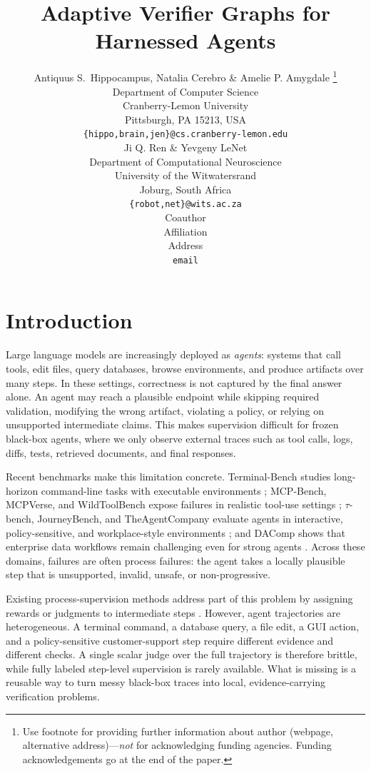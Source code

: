 \documentclass{article} %
\title{Adaptive Verifier Graphs for Harnessed Agents}
\author{Antiquus S.~Hippocampus, Natalia Cerebro \& Amelie P. Amygdale \thanks{ Use footnote for providing further information
about author (webpage, alternative address)---\emph{not} for acknowledging
funding agencies.  Funding acknowledgements go at the end of the paper.} \\
Department of Computer Science\\
Cranberry-Lemon University\\
Pittsburgh, PA 15213, USA \\
\texttt{\{hippo,brain,jen\}@cs.cranberry-lemon.edu} \\
\And
Ji Q. Ren \& Yevgeny LeNet \\
Department of Computational Neuroscience \\
University of the Witwatersrand \\
Joburg, South Africa \\
\texttt{\{robot,net\}@wits.ac.za} \\
\AND
Coauthor \\
Affiliation \\
Address \\
\texttt{email}
}
\begin{document}
\maketitle

\section{Introduction}
\label{sec:introduction}

Large language models are increasingly deployed as \emph{agents}: systems that call tools, edit files, query databases, browse environments, and produce artifacts over many steps. In these settings, correctness is not captured by the final answer alone. An agent may reach a plausible endpoint while skipping required validation, modifying the wrong artifact, violating a policy, or relying on unsupported intermediate claims. This makes supervision difficult for frozen black-box agents, where we only observe external traces such as tool calls, logs, diffs, tests, retrieved documents, and final responses.

Recent benchmarks make this limitation concrete. Terminal-Bench studies long-horizon command-line tasks with executable environments \citep{merrill2026terminalbench}; MCP-Bench, MCPVerse, and WildToolBench expose failures in realistic tool-use settings \citep{wang2025mcpbench,lei2026mcpverse,yu2026wildtoolbench}; $\tau$-bench, JourneyBench, and TheAgentCompany evaluate agents in interactive, policy-sensitive, and workplace-style environments \citep{yao2025taubench,balaji2026journeybench,xu2024theagentcompany}; and DAComp shows that enterprise data workflows remain challenging even for strong agents \citep{lei2026dacomp}. Across these domains, failures are often process failures: the agent takes a locally plausible step that is unsupported, invalid, unsafe, or non-progressive.

Existing process-supervision methods address part of this problem by assigning rewards or judgments to intermediate steps \citep{setlur2025rewardingprogress,fan2026agentprocessbench}. However, agent trajectories are heterogeneous. A terminal command, a database query, a file edit, a GUI action, and a policy-sensitive customer-support step require different evidence and different checks. A single scalar judge over the full trajectory is therefore brittle, while fully labeled step-level supervision is rarely available. What is missing is a reusable way to turn messy black-box traces into local, evidence-carrying verification problems.
\end{document}

